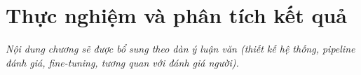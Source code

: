 \chapter{Thực nghiệm và phân tích kết quả}\label{chap:thuc-nghiem}

\textit{Nội dung chương sẽ được bổ sung theo dàn ý luận văn (thiết kế hệ thống, pipeline đánh giá, fine-tuning, tương quan với đánh giá người).}
